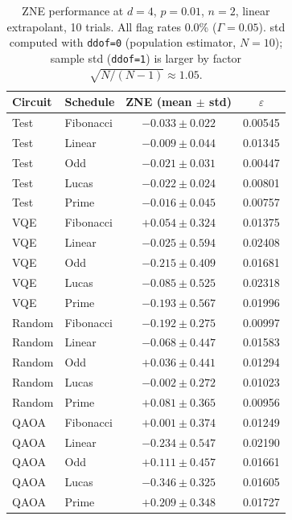 \documentclass[10pt,letterpaper]{article}
\begin{document}
\begin{table}[H]
\caption{ZNE performance at $d=4$, $p=0.01$, $n=2$, linear extrapolant,
  10 trials. All flag rates 0.0\% ($\Gamma=0.05$).
  std computed with \texttt{ddof=0} (population estimator, $N=10$);
  sample std (\texttt{ddof=1}) is larger by factor
  $\sqrt{N/(N-1)}\approx 1.05$.}
\label{tab:stability}
\centering\small
\setlength{\tabcolsep}{4pt}
\begin{tabular}{llcc}
\toprule
Circuit & Schedule & ZNE (mean $\pm$ std) & $\varepsilon$ \\
\midrule
Test    & Fibonacci & $-0.033\pm 0.022$ & 0.00545 \\
Test    & Linear    & $-0.009\pm 0.044$ & 0.01345 \\
Test    & Odd       & $-0.021\pm 0.031$ & 0.00447 \\
Test    & Lucas     & $-0.022\pm 0.024$ & 0.00801 \\
Test    & Prime     & $-0.016\pm 0.045$ & 0.00757 \\
\midrule
VQE     & Fibonacci & $+0.054\pm 0.324$ & 0.01375 \\
VQE     & Linear    & $-0.025\pm 0.594$ & 0.02408 \\
VQE     & Odd       & $-0.215\pm 0.409$ & 0.01681 \\
VQE     & Lucas     & $-0.085\pm 0.525$ & 0.02318 \\
VQE     & Prime     & $-0.193\pm 0.567$ & 0.01996 \\
\midrule
Random  & Fibonacci & $-0.192\pm 0.275$ & 0.00997 \\
Random  & Linear    & $-0.068\pm 0.447$ & 0.01583 \\
Random  & Odd       & $+0.036\pm 0.441$ & 0.01294 \\
Random  & Lucas     & $-0.002\pm 0.272$ & 0.01023 \\
Random  & Prime     & $+0.081\pm 0.365$ & 0.00956 \\
\midrule
QAOA    & Fibonacci & $+0.001\pm 0.374$ & 0.01249 \\
QAOA    & Linear    & $-0.234\pm 0.547$ & 0.02190 \\
QAOA    & Odd       & $+0.111\pm 0.457$ & 0.01661 \\
QAOA    & Lucas     & $-0.346\pm 0.325$ & 0.01605 \\
QAOA    & Prime     & $+0.209\pm 0.348$ & 0.01727 \\
\bottomrule
\end{tabular}
\end{table}
\end{document}
